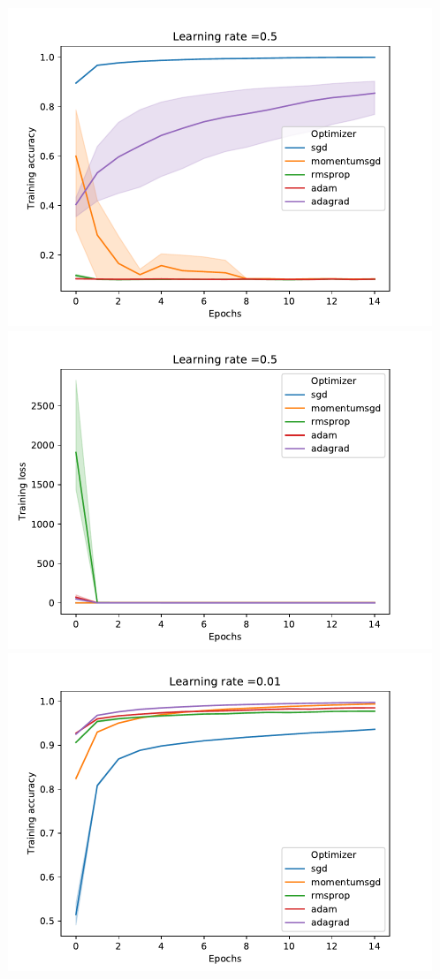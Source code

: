 \documentclass[letterpaper]{article}
\providecommand{\1}{\mathbf{1}}
\providecommand{\0}{\mathbf{0}}
\begin{document}
\begin{figure}[H]
        \centering
        \begin{minipage}{.45\textwidth}
         \includegraphics[width=.9\textwidth]{img/acc_05}
        \end{minipage}
        \begin{minipage}{.45\textwidth}
         \includegraphics[width=.9\textwidth]{img/loss_05}
        \end{minipage}
        \begin{minipage}{.45\textwidth}
         \includegraphics[width=.9\textwidth]{img/acc_001}

\end{minipage}
\end{figure}
\end{document}
